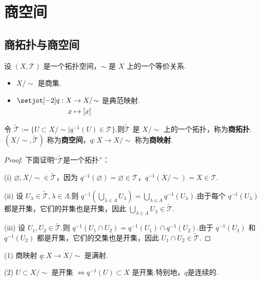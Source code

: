 \chapter{商空间}

\section{商拓扑与商空间}

\begin{definition}[商空间]
    设 $(X, \mathcal{T})$ 是一个拓扑空间，$\sim$ 是 $X$ 上的一个等价关系.
    \begin{itemize}
        \item $X/\!\sim$ 是商集.
        \item $\setjot[-2]\begin{aligned}[t]
            q: X &\to X/\!\sim \\
            x &\mapsto [x]
        \end{aligned}$ 是典范映射.
    \end{itemize}
    令 $\tilde{\mathcal{T}} := \{ U \subset X/\!\sim \mid q^{-1}(U) \in \mathcal{T} \}$.则$\tilde{\mathcal{T}}$ 是 $X/\!\sim$ 上的一个拓扑，称为\textbf{商拓扑}. $(X/\!\sim, \tilde{\mathcal{T}})$ 称为\textbf{商空间}，$q:X\to X/\!\sim$ 称为\textbf{商映射}.
\end{definition}
\begin{proof}
    下面证明“$\tilde{\mathcal{T}}$是一个拓扑”： \par
    (i) $\varnothing, X/\!\sim \in \tilde{\mathcal{T}}$，因为 $q^{-1}(\varnothing)=\varnothing \in \mathcal{T}$，$q^{-1}(X/\!\sim)=X \in \mathcal{T}$.

    (ii) 设 $U_\lambda \in \tilde{\mathcal{T}}, \lambda \in \Lambda$.则 $q^{-1}(\bigcup_{\lambda \in \Lambda} U_\lambda) = \bigcup_{\lambda \in \Lambda} q^{-1}(U_\lambda)$.由于每个 $q^{-1}(U_\lambda)$ 都是开集，它们的并集也是开集，因此 $\bigcup_{\lambda \in \Lambda} U_\lambda \in \tilde{\mathcal{T}}$.

    (iii) 设 $U_1, U_2 \in \tilde{\mathcal{T}}$.则 $q^{-1}(U_1 \cap U_2) = q^{-1}(U_1) \cap q^{-1}(U_2)$.由于 $q^{-1}(U_1)$ 和 $q^{-1}(U_2)$ 都是开集，它们的交集也是开集，因此 $U_1 \cap U_2 \in \tilde{\mathcal{T}}$.
\end{proof}

\begin{remark}
    (1) 商映射 $q: X \to X/\!\sim$ 是满射.\par
    (2) $U \subset X/\!\sim$ 是开集 $\iff q^{-1}(U) \subset X$ 是开集.特别地，$q$是连续的.
\end{remark}

